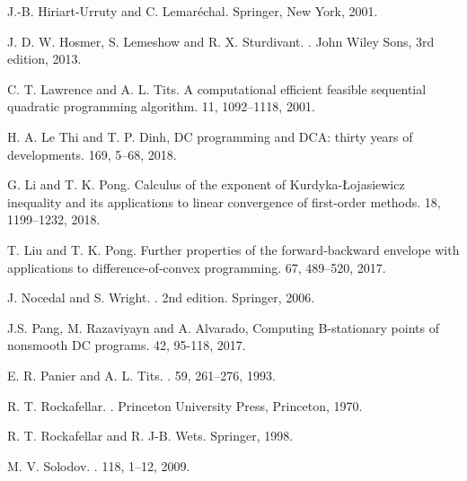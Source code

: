\documentclass[10pt]{article}
\numberwithin{equation}{section}
\begin{document}
\begin{thebibliography}{99}
J.-B. Hiriart-Urruty and C. Lemar\'{e}chal.
\newblock Springer, New York, 2001.


J. D. W. Hosmer, S. Lemeshow and R. X. Sturdivant.
.
\newblock John Wiley Sons, 3rd edition, 2013.

C. T. Lawrence and A. L. Tits.
\newblock A computational efficient feasible sequential quadratic programming algorithm.
 11, 1092--1118, 2001.

{\color{black}
\newblock H. A. Le Thi and
T. P. Dinh, DC programming and DCA: thirty years of
developments.
  169, 5--68, 2018.}


G. Li and T. K. Pong.
\newblock Calculus of the exponent of Kurdyka-{\L}ojasiewicz inequality and its applications to linear convergence of first-order methods.
 18, 1199--1232, 2018.

T. Liu and T. K. Pong.
\newblock Further properties of the forward-backward envelope with applications to difference-of-convex programming.
 67, 489--520, 2017.

J. Nocedal and S. Wright.
.
\newblock 2nd edition. Springer, 2006.


{\color{black}  J.S. Pang, M. Razaviyayn and A. Alvarado,
\newblock Computing B-stationary points of
nonsmooth DC programs.
 42, 95-118, 2017.}

E. R. Panier and A. L. Tits.
.
 59, 261--276, 1993.

R. T. Rockafellar.
.
\newblock Princeton University Press, Princeton, 1970.

R. T. Rockafellar and R. J-B. Wets.
\newblock Springer, 1998.

M. V. Solodov.
.
 118, 1--12, 2009.


\end{thebibliography}
\end{document}

